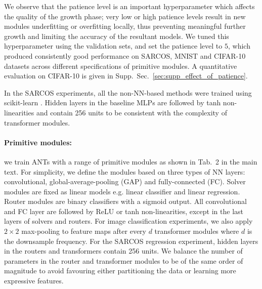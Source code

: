 We observe that the patience level is an important hyperparameter which affects the quality of the growth phase; very low or high patience levels result in new modules underfitting or overfitting locally, thus preventing meaningful further growth and limiting the accuracy of the resultant models. We tuned this hyperparameter using the validation sets, and set the patience level to $5$, which produced consistently good performance on SARCOS, MNIST and CIFAR-10 datasets across different specifications of primitive modules. A quantitative evaluation on CIFAR-10 is given in Supp.~Sec.~\ref{sec:supp_effect_of_patience}.

In the SARCOS experiments, all the non-NN-based methods were trained using scikit-learn \cite{pedregosa2011scikit}. Hidden layers in the baseline MLPs are followed by tanh non-linearities and contain 256 units to be consistent with the complexity of transformer modules.

\paragraph{Primitive modules:} we train ANTs with a range of primitive modules as shown in Tab.~2 in the main text. For simplicity, we define the modules based on three types of NN layers: convolutional, global-average-pooling (GAP) and fully-connected (FC). Solver modules are fixed as linear models e.g. linear classifier and linear regression. Router modules are binary classifiers with a sigmoid output. All convolutional and FC layer are followed by ReLU or tanh non-linearities, except in the last layers of solvers and routers. For image classification experiments, we also apply $2\times2$ max-pooling to feature maps after every $d$ transformer modules where $d$ is the downsample frequency. For the SARCOS regression experiment, hidden layers in the routers and transformers contain 256 units. We balance the number of parameters in the router and transformer modules to be of the same order of magnitude to avoid favouring either partitioning the data or learning more expressive features. 


